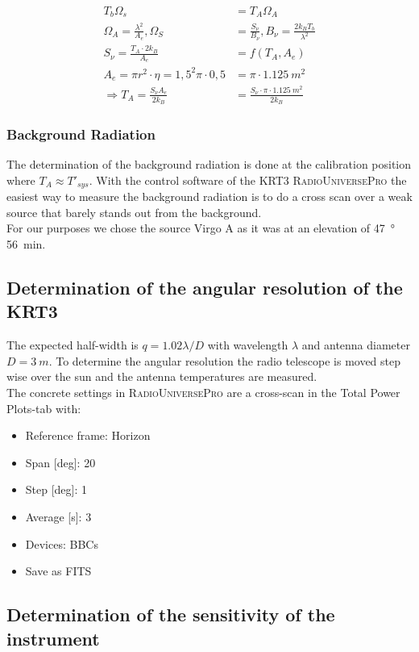 \documentclass[10pt,a4paper, bibliography=totoc]{scrartcl}
\begin{document}
\begin{align}
	T_b\Omega_s&=T_A\Omega_A\\
	\Omega_{A}=\frac{\lambda^2}{A_{e}}, \Omega_{S}&=\frac{S_{\nu}}{B_{\nu}}, B_{\nu}=\frac{2k_{B}T_{b}}{\lambda^2}\\
	S_{\nu}=\frac{T_{A}\cdot 2k_{B}}{A_{e}}&=f(T_{A},A_{e})\\
	A_{e}=\pi r^{2}\cdot\eta=1,5^2\pi\cdot0,5&=\pi\cdot\qty{1,125}{m^2}\\
	\Rightarrow T_{A}=\frac{S_{\nu}A_{e}}{2k_{B}}&=\frac{S_{\nu}\cdot\pi\cdot\qty{1,125}{m^2}}{2k_{B}}
\end{align}

\subsubsection{Background Radiation}
The determination of the background radiation is done at the calibration position where $T_A\approx T'_{sys}$. With the control software of the KRT3 \textsc{RadioUniversePro} the easiest way to measure the background radiation is to do a cross scan over a weak source that barely stands out from the background.\\
For our purposes we chose the source Virgo A as it was at an elevation of \qty{47}{\degree}\,\qty{56}{min}.

\subsection{Determination of the angular resolution of the KRT3}
The expected half-width is $q=1.02 \lambda /D$ with wavelength $\lambda$ and antenna diameter $D=\qty{3}{m}$. To determine the angular resolution the radio telescope is moved step wise over the sun and the antenna temperatures are measured.\\
The concrete settings in \textsc{RadioUniversePro} are a cross-scan in the Total Power Plots-tab with:
\begin{itemize}
	\item Reference frame: Horizon
	\item Span [deg]: 20
	\item Step [deg]: 1
	\item Average [s]: 3
	\item Devices: BBCs
	\item Save as FITS
\end{itemize}

\subsection{Determination of the sensitivity of the instrument}
\end{document}
